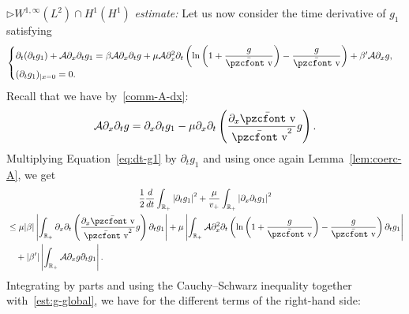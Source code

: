 \documentclass[10pt]{amsart}
\theoremstyle{definition}\newtheorem{defi}[theo]{Definition}\newtheorem{rema}[theo]{Remark}\newtheorem{exam}[theo]{Example}\newtheorem{exem}[theo]{Example}\newtheorem{nota}[theo]{Notation}
\newcommand{\mathpzc}[1]{\text{\pzcfont #1}}
\newcommand{\R}{\mathbb{R}}
\newcommand{\bv}{\bar{\mathpzc{v}}}
\newcommand{\cA}{\mathcal A}
\begin{document}

$\rhd W^{1,\infty}(L^2)\cap H^1(H^1)$ \emph{estimate:} Let us now consider the time derivative of $g_1$ satisfying
\begin{equation}\label{eq:dt-g1}
\begin{cases}
\partial_t(\partial_t g_1) + \cA \partial_x \partial_t g_1 = \beta \cA \partial_x \partial_t g + \mu \cA \partial_x^2 \partial_t \left(\ln \left(1+ \dfrac{g}{\bv}\right) - \dfrac{g}{\bv} \right) + \beta'\cA\partial_x g, \\
(\partial_t g_1)_{|x=0} = 0.
\end{cases}
\end{equation}
Recall that we have by~\eqref{comm-A-dx}:
\[
\cA \partial_x \partial_t g = \partial_x \partial_t g_1 - \mu \partial_x \partial_t \left(\dfrac{\partial_x \bv}{\bv^2}g\right).
\]
Multiplying Equation~\eqref{eq:dt-g1} by $\partial_t g_1$ and using once again Lemma~\ref{lem:coerc-A}, we get
\begin{multline*}
 \dfrac{1}{2} \dfrac{d}{dt} \int_{\R_+} \left|\partial_t g_1\right|^2 + \dfrac{\mu}{v_+} \int_{\R_+} \left|\partial_x \partial_t g_1\right|^2 \\
\begin{aligned}
& \leq \mu |\beta| \left|\int_{\R_+} \partial_x \partial_t \left(\dfrac{\partial_x \bv}{\bv^2} g \right) \partial_t g_1 \right| + \mu \left| \int_{\R_+} \cA \partial_x^2 \partial_t \left(\ln \left(1+ \dfrac{g}{\bv}\right) - \dfrac{g}{\bv} \right) \partial_t g_1\right| \\
& \quad + |\beta'| \left| \int_{\R_+}\cA\partial_x g \partial_t g_1 \right|.
\end{aligned}
\end{multline*}
Integrating by parts and using the Cauchy--Schwarz inequality together with~\eqref{est:g-global}, we have for the different terms of the right-hand side:
\end{document}
